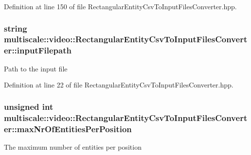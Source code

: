 \-Definition at line 150 of file \-Rectangular\-Entity\-Csv\-To\-Input\-Files\-Converter.\-hpp.

\hypertarget{classmultiscale_1_1video_1_1RectangularEntityCsvToInputFilesConverter_adde5ccc0bde141f73917eba8029fe1f6}{
\subsubsection[{input\-Filepath}]{\setlength{\rightskip}{0pt plus 5cm}string {\bf multiscale\-::video\-::\-Rectangular\-Entity\-Csv\-To\-Input\-Files\-Converter\-::input\-Filepath}}}\label{classmultiscale_1_1video_1_1RectangularEntityCsvToInputFilesConverter_adde5ccc0bde141f73917eba8029fe1f6}
\-Path to the input file 

\-Definition at line 22 of file \-Rectangular\-Entity\-Csv\-To\-Input\-Files\-Converter.\-hpp.

\hypertarget{classmultiscale_1_1video_1_1RectangularEntityCsvToInputFilesConverter_adcea224ee3e6f8fbecca3754774afbac}{
\subsubsection[{max\-Nr\-Of\-Entities\-Per\-Position}]{\setlength{\rightskip}{0pt plus 5cm}unsigned int {\bf multiscale\-::video\-::\-Rectangular\-Entity\-Csv\-To\-Input\-Files\-Converter\-::max\-Nr\-Of\-Entities\-Per\-Position}}}\label{classmultiscale_1_1video_1_1RectangularEntityCsvToInputFilesConverter_adcea224ee3e6f8fbecca3754774afbac}
\-The maximum number of entities per position 

